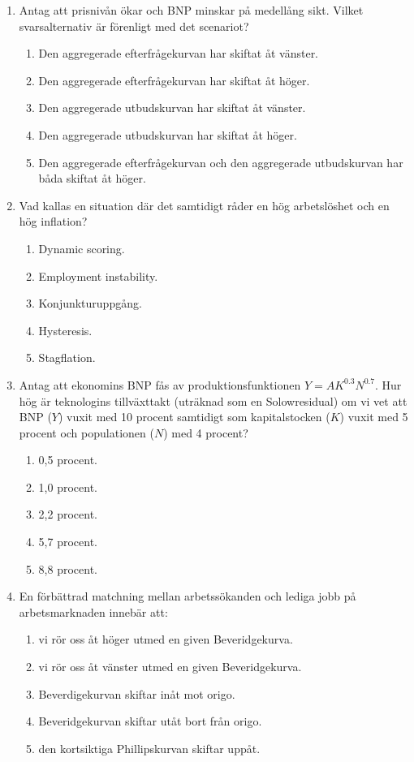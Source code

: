 \documentclass[12pt,a4paper]{article}
\begin{document}
\begin{enumerate}[label=\arabic*.]
    \item Antag att prisnivån ökar och BNP minskar på medellång sikt. Vilket svarsalternativ är förenligt med det scenariot?
    \begin{enumerate}[label=\Alph*.]
        \item Den aggregerade efterfrågekurvan har skiftat åt vänster.
        \item Den aggregerade efterfrågekurvan har skiftat åt höger.
        \item Den aggregerade utbudskurvan har skiftat åt vänster.
        \item Den aggregerade utbudskurvan har skiftat åt höger.
        \item Den aggregerade efterfrågekurvan och den aggregerade utbudskurvan har båda skiftat åt höger.
    \end{enumerate}

    \item Vad kallas en situation där det samtidigt råder en hög arbetslöshet och en hög inflation?
    \begin{enumerate}[label=\Alph*.]
        \item Dynamic scoring.
        \item Employment instability.
        \item Konjunkturuppgång.
        \item Hysteresis.
        \item Stagflation.
    \end{enumerate}

    \item Antag att ekonomins BNP fås av produktionsfunktionen $Y = A K^{0.3} N^{0.7}$. Hur hög är teknologins tillväxttakt (uträknad som en Solowresidual) om vi vet att BNP ($Y$) vuxit med 10 procent samtidigt som kapitalstocken ($K$) vuxit med 5 procent och populationen ($N$) med 4 procent?
    \begin{enumerate}[label=\Alph*.]
        \item 0,5 procent.
        \item 1,0 procent.
        \item 2,2 procent.
        \item 5,7 procent.
        \item 8,8 procent.
    \end{enumerate}

    \item En förbättrad matchning mellan arbetssökanden och lediga jobb på arbetsmarknaden innebär att:
    \begin{enumerate}[label=\Alph*.]
        \item vi rör oss åt höger utmed en given Beveridgekurva.
        \item vi rör oss åt vänster utmed en given Beveridgekurva.
        \item Beverdigekurvan skiftar inåt mot origo.
        \item Beveridgekurvan skiftar utåt bort från origo.
        \item den kortsiktiga Phillipskurvan skiftar uppåt.
    \end{enumerate}


\end{enumerate}
\end{document}

